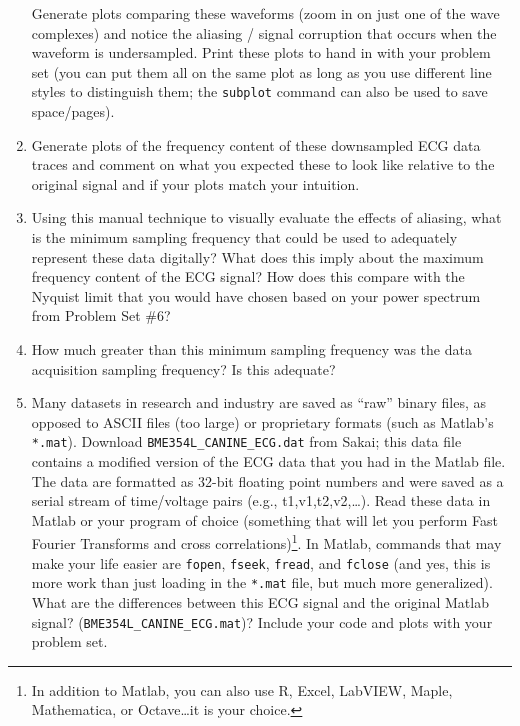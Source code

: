 \begin{enumerate}
Generate plots comparing these waveforms (zoom in on just one of the wave
complexes) and notice the aliasing / signal corruption that occurs when the
waveform is undersampled.  Print these plots to hand in with your problem set
(you can put them all on the same plot as long as you use different line styles
to distinguish them; the \verb+subplot+ command can also be used to save
space/pages). 

\item Generate plots of the frequency content of these downsampled ECG data
traces and comment on what you expected these to look like relative to the
original signal and if your plots match your intuition. 

\item Using this manual technique to visually evaluate the effects of aliasing,
what is the minimum sampling frequency that could be used to adequately
represent these data digitally?  What does this imply about the maximum
frequency content of the ECG signal?  How does this compare with the Nyquist
limit that you would have chosen based on your power spectrum from Problem Set
\#6? 

\item How much greater than this minimum sampling frequency was the data
acquisition sampling frequency? Is this adequate? 


\item Many datasets in research and industry are saved as ``raw'' binary files,
as opposed to ASCII files (too large) or proprietary formats (such as Matlab's
\verb+*.mat+).  Download \verb+BME354L_CANINE_ECG.dat+ from Sakai; this
data file contains a modified version of the ECG data that you had in the Matlab file.
The data are formatted as 32-bit floating point numbers and were saved as a
serial stream of time/voltage pairs (e.g., t1,v1,t2,v2,\ldots).  Read these data
in Matlab or your program of choice (something that will let you perform Fast
Fourier Transforms and cross correlations)\footnote{In addition to Matlab, you
can also use R, Excel, LabVIEW, Maple, Mathematica, or Octave\ldots it is your
choice.}.  In Matlab, commands that may make your life easier are \verb+fopen+,
\verb+fseek+, \verb+fread+, and \verb+fclose+ (and yes, this is more work than
just loading in the \verb+*.mat+ file, but much more generalized).  What are
the differences between this ECG signal and the original Matlab signal?
(\verb+BME354L_CANINE_ECG.mat+)?  Include your code and plots with your
problem set. 


\end{enumerate}
